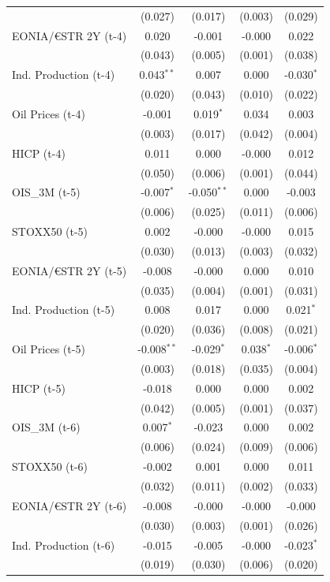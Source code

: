 \begin{longtable}[t]{lcccc}
 & (0.027) & (0.017) & (0.003) & (0.029)\\
EONIA/€STR 2Y (t-4) & 0.020 & -0.001 & -0.000 & 0.022\\
 & (0.043) & (0.005) & (0.001) & (0.038)\\
Ind. Production (t-4) & 0.043$^{**}$ & 0.007 & 0.000 & -0.030$^{*}$\\
 & (0.020) & (0.043) & (0.010) & (0.022)\\
Oil Prices (t-4) & -0.001 & 0.019$^{*}$ & 0.034 & 0.003\\
 & (0.003) & (0.017) & (0.042) & (0.004)\\
HICP (t-4) & 0.011 & 0.000 & -0.000 & 0.012\\
 & (0.050) & (0.006) & (0.001) & (0.044)\\
OIS\_3M (t-5) & -0.007$^{*}$ & -0.050$^{**}$ & 0.000 & -0.003\\
 & (0.006) & (0.025) & (0.011) & (0.006)\\
STOXX50 (t-5) & 0.002 & -0.000 & -0.000 & 0.015\\
 & (0.030) & (0.013) & (0.003) & (0.032)\\
EONIA/€STR 2Y (t-5) & -0.008 & -0.000 & 0.000 & 0.010\\
 & (0.035) & (0.004) & (0.001) & (0.031)\\
Ind. Production (t-5) & 0.008 & 0.017 & 0.000 & 0.021$^{*}$\\
 & (0.020) & (0.036) & (0.008) & (0.021)\\
Oil Prices (t-5) & -0.008$^{**}$ & -0.029$^{*}$ & 0.038$^{*}$ & -0.006$^{*}$\\
 & (0.003) & (0.018) & (0.035) & (0.004)\\
HICP (t-5) & -0.018 & 0.000 & 0.000 & 0.002\\
 & (0.042) & (0.005) & (0.001) & (0.037)\\
OIS\_3M (t-6) & 0.007$^{*}$ & -0.023 & 0.000 & 0.002\\
 & (0.006) & (0.024) & (0.009) & (0.006)\\
STOXX50 (t-6) & -0.002 & 0.001 & 0.000 & 0.011\\
 & (0.032) & (0.011) & (0.002) & (0.033)\\
EONIA/€STR 2Y (t-6) & -0.008 & -0.000 & -0.000 & -0.000\\
 & (0.030) & (0.003) & (0.001) & (0.026)\\
Ind. Production (t-6) & -0.015 & -0.005 & -0.000 & -0.023$^{*}$\\
 & (0.019) & (0.030) & (0.006) & (0.020)\\

\end{longtable}

